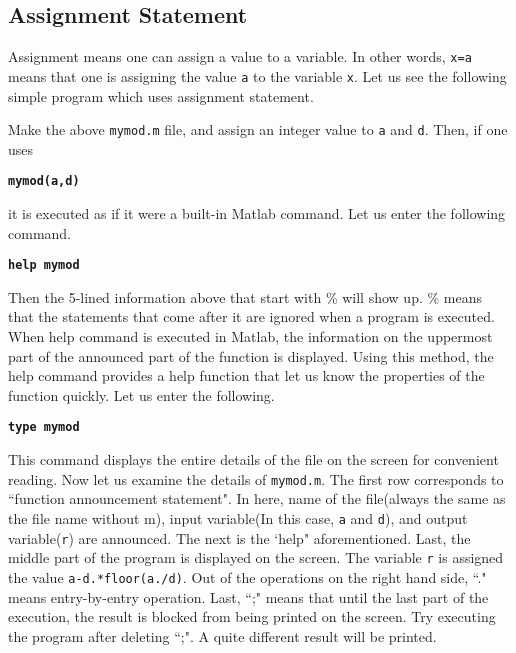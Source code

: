 \subsection{Assignment Statement}
Assignment means one can assign a value to a variable. In other words, {\tt x=a} means that one is assigning the value {\tt a} to the variable {\tt x}. Let us see the following simple program which uses assignment statement.

\vv
\begin{center}
\end{center} \vn Make the above {\tt mymod.m} file, and assign an integer value to {\tt a} and {\tt d}. Then, if one uses

\matlabp \texttt{\textbf{mymod(a,d)}}

\vn it is executed as if it were a built-in Matlab command. Let us enter the following command.

\matlabp \texttt{\textbf{help mymod}}

\vn Then the 5-lined information above that start with \% will show up. \% means that the statements that come after it are ignored when a program is executed. When help command is executed in Matlab, the information on the uppermost part of the announced part of the function is displayed. Using this method, the help command provides a help function that let us know the properties of the function quickly. Let us enter the following.

\matlabp\texttt{\textbf{type mymod}}

\vn This command displays the entire details of the file on the screen for convenient reading. Now let us examine the details of {\tt mymod.m}. The first row corresponds to ``function announcement statement". In here, name of the file(always the same as the file name without m), input variable(In this case, {\tt a} and {\tt d}), and output variable({\tt r}) are announced. The next is the `help" aforementioned. Last, the middle part of the program is displayed on the screen. The variable {\tt r} is assigned the value {\tt a-d.*floor(a./d)}. Out of the operations on the right hand side, ``." means entry-by-entry operation. Last, ``;" means that until the last part of the execution, the result is blocked from being printed on the screen. Try executing the program after deleting ``;". A quite different result will be printed.


